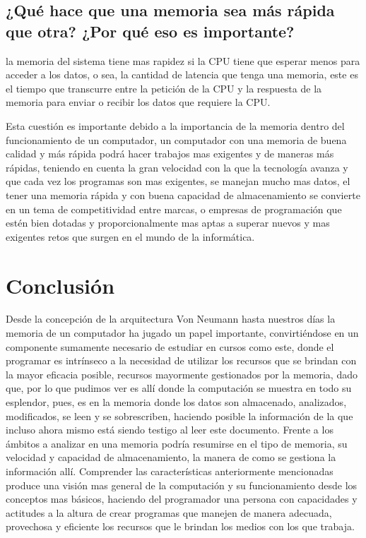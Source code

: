 \documentclass{article}
\begin{document}
    
    
    \subsection{¿Qué hace que una memoria sea más rápida que otra? ¿Por qué eso es importante?}
    la memoria del sistema tiene mas rapidez si la CPU tiene que esperar menos para acceder a los datos, o sea, la cantidad de latencia que tenga una memoria, este es el tiempo que transcurre entre la petición de la CPU y la respuesta de la memoria para enviar o recibir los datos que requiere la CPU. 
    
    Esta cuestión es importante debido a la importancia de la memoria dentro del funcionamiento de un computador, un computador con una memoria de buena calidad y más rápida podrá hacer trabajos mas exigentes y de maneras más rápidas, teniendo en cuenta la gran velocidad con la que la tecnología avanza y que cada vez los programas son mas exigentes, se manejan mucho mas datos, el tener una memoria rápida y con buena capacidad de almacenamiento se convierte en un tema de competitividad entre marcas, o empresas de programación que estén bien dotadas y proporcionalmente mas aptas a superar nuevos y mas exigentes retos que surgen en el mundo de la informática. 


\section{Conclusión} \label{conclulsion}
Desde la concepción de la arquitectura Von Neumann hasta nuestros días la memoria de un computador ha jugado un papel importante, convirtiéndose en un componente sumamente necesario de estudiar en cursos como este, donde el programar es intrínseco a la necesidad de utilizar los recursos que se brindan con la mayor eficacia posible, recursos mayormente gestionados por la memoria, dado que, por lo que pudimos ver es allí donde la computación se muestra en todo su esplendor, pues, es en la memoria donde los datos son almacenado, analizados, modificados, se leen y se sobrescriben, haciendo posible la información de la que incluso ahora mismo está siendo testigo al leer este documento. Frente a los ámbitos a analizar en una memoria podría resumirse en el tipo de memoria, su velocidad y capacidad de almacenamiento, la manera de como se gestiona la información allí. Comprender las características anteriormente mencionadas produce una  visión mas general de la computación y su funcionamiento desde los conceptos mas básicos, haciendo del programador una persona con capacidades y actitudes a la altura de crear programas que manejen de manera adecuada, provechosa y eficiente los recursos que le brindan los medios con los que trabaja.


\end{document}
